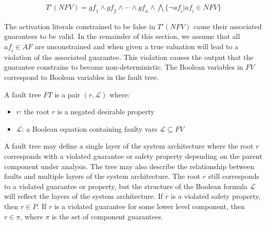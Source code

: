 \begin{gather*}
T'(\mathit{NFV}) = \mathit{gf_1} \land \mathit{gf_2} \land \cdots \land \mathit{gf_n} \land \bigwedge \{\neg \mathit{af_i} | \mathit{af_i} \in \mathit{NFV} \}
\end{gather*}

The activation literals constrained to be false in $T'(\mathit{NFV})$ cause their associated guarantees to be valid. In the remainder of this section, we assume that all $\mathit{af_i} \in \mathit{AF}$ are unconstrained and when given a true valuation will lead to a violation of the associated guarantee. This violation causes the output that the guarantee constrains to become non-deterministic. The Boolean variables in $\mathit{FV}$ correspond to Boolean variables in the fault tree. 



\begin{definition}
A fault tree $\mathit{FT}$ is a pair $(r, \mathcal{L})$ where:
\begin{itemize}
\item[] $r$: the root $r$ is a negated desirable property
\item[] $\mathcal{L}$: a Boolean equation containing faulty vars $\mathcal{L} \subseteq \mathit{FV}$
\end{itemize}
\end{definition}

A fault tree may define a single layer of the system architecture where the root $r$ corresponds with a violated guarantee or safety property depending on the parent component under analysis. The tree may also describe the relationship between faults and multiple layers of the system architecture. The root $r$ still corresponds to a violated guarantee or property, but the structure of the Boolean formula $\mathcal{L}$ will reflect the layers of the system architecture. If $r$ is a violated safety property, then $r \in P$. If $r$ is a violated guarantee for some lower level component, then $r \in \pi$, where $\pi$ is the set of component guarantees. 

